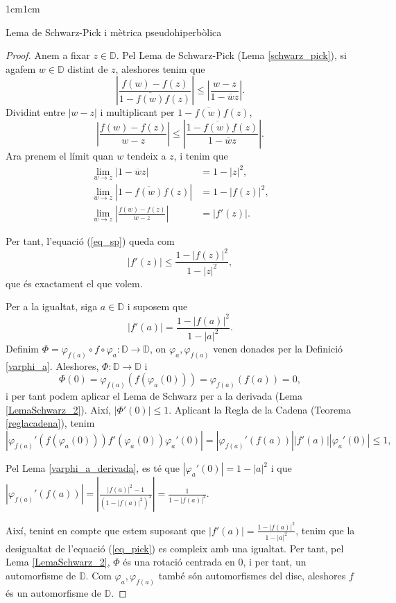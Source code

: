 \begin{adjustwidth}{1cm}{1cm}
\begin{subsection}{Lema de Schwarz-Pick i mètrica pseudohiperbòlica}
\begin{proof}
    Anem a fixar $z\in \mathbb{D}$. Pel Lema de Schwarz-Pick (Lema \ref{schwarz_pick}), si agafem $w\in \mathbb{D}$ distint de $z$, aleshores tenim que 
    \[
        \left|\frac{f(w)-f(z)}{1-\overline{f(w)}f(z)}\right|\leq\left|\frac{w-z}{1-\overline{w}z}\right|.
    \]
    Dividint entre $|w-z|$ i multiplicant per $1-\overline{f(w)}f(z)$, 
    \[
        \left|\frac{f(w)-f(z)}{w-z}\right|\leq\left|\frac{1-\overline{f(w)}f(z)}{1-\overline{w}z}\right|.
    \]
    Ara prenem el límit quan $w$ tendeix a $z$, i tenim que 
    \begin{equation}
        \begin{aligned}
            \lim_{w\to z}|1-\overline{w}z| &= 1-|z|^2, \\
            \lim_{w\to z}|1-\overline{f(w)}f(z)| &= 1-|f(z)|^2,\\
            \lim_{w\to z}\left|\frac{f(w)-f(z)}{w-z}\right| &= |f'(z)|.
        \end{aligned}
        \label{eq_limit_met_pseudohip}
    \end{equation}

    Per tant, l'equació (\ref{eq_sp}) queda com 
    \[
        |f'(z)|\leq \frac{1-|f(z)|^2}{1-|z|^2},
    \]
    que és exactament el que volem.

    Per a la igualtat, siga $a\in \mathbb{D}$ i suposem que 
    \[
        |f'(a)|=\frac{1-|f(a)|^2}{1-|a|^2}.
    \] 
    Definim $\Phi=\varphi_{f(a)}\circ f\circ \varphi_a:\mathbb{D}\to \mathbb{D}$, on $\varphi_a,\varphi_{f(a)}$ venen donades per la Definició \ref{varphi_a}. Aleshores, $\Phi:\mathbb{D}\to \mathbb{D}$ i
    \[
        \Phi(0)=\varphi_{f(a)}(f(\varphi_a(0)))=\varphi_{f(a)}(f(a))=0,
    \]
    i per tant podem aplicar el Lema de Schwarz per a la derivada (Lema \ref{LemaSchwarz_2}). Així, $|\Phi'(0)|\leq 1$. Aplicant la Regla de la Cadena (Teorema \ref{reglacadena}), tenim
    \begin{equation}
        |\varphi_{f(a)}'(f(\varphi_a(0)))f'(\varphi_a(0))\varphi_a'(0)|=|\varphi_{f(a)}'(f(a))||f'(a)||\varphi_a'(0)|\leq 1,
        \label{eq_pick}
    \end{equation}

    Pel Lema \ref{varphi_a_derivada}, es té que  $|\varphi_a'(0)|=1-|a|^2$ i que $|\varphi_{f(a)}'(f(a))|=\left|\frac{|f(a)|^2-1}{(1-|f(a)|^2)^2}\right|=\frac{1}{1-|f(a)|^2}$.

    Així, tenint en compte que estem suposant que $|f'(a)|=\frac{1-|f(a)|^2}{1-|a|^2}$, tenim que la desigualtat de l'equació (\ref{eq_pick}) es compleix amb una igualtat. Per tant, pel Lema \ref{LemaSchwarz_2}, $\Phi$ és una rotació centrada en $0$, i per tant, un automorfisme de $\mathbb{D}$. Com $\varphi_a,\varphi_{f(a)}$ també són automorfismes del disc, aleshores $f$ és un automorfisme de $\mathbb{D}$. 


\end{proof}
\end{subsection}
\end{adjustwidth}
